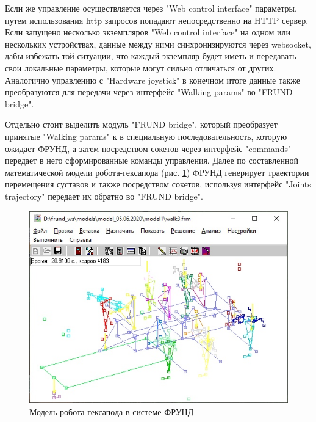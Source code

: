 Если же управление осуществляется через "Web control interface"{} параметры, путем использования http запросов попадают непосредственно на HTTP сервер. Если запущено несколько экземпляров "Web control interface"{} на одном или нескольких устройствах, данные между ними синхронизируются через websocket, дабы избежать той ситуации, что каждый экземпляр будет иметь и передавать свои локальные параметры, которые могут сильно отличаться от других. Аналогично управлению с "Hardware joystick"{} в конечном итоге данные также преобразуются для передачи через интерфейс "Walking params"{} во "FRUND bridge"{}.

Отдельно стоит выделить модуль "FRUND bridge"{}, который преобразует принятые "Walking params"{} к в специальную последовательность, которую ожидает ФРУНД, а затем посредством сокетов через интерфейс "commands"{} передает в него сформированные команды управления. Далее по составленной математической модели робота-гексапода (рис. \ref{img:frund}) ФРУНД генерирует траектории перемещения суставов и также посредством сокетов, используя интерфейс "Joints trajectory"{} передает их обратно во "FRUND bridge"{}.

\begin{figure}[h!]
	\centering
	\includegraphics[width = 0.9\linewidth]{img/frund}
	\caption{Модель робота-гексапода в системе ФРУНД}
	\label{img:frund}
\end{figure}

